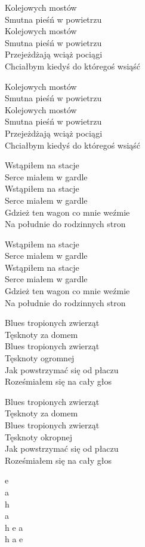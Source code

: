 
\begin{text}
    Kolejowych mostów\\
    Smutna pieśń w powietrzu\\
    Kolejowych mostów\\
    Smutna pieśń w powietrzu\\
    Przejeżdżają wciąż pociągi\\
    Chciałbym kiedyś do któregoś wsiąść

    Kolejowych mostów\\
    Smutna pieśń w powietrzu\\
    Kolejowych mostów\\
    Smutna pieśń w powietrzu\\
    Przejeżdżają wciąż pociągi\\
    Chciałbym kiedyś do któregoś wsiąść

    Wstąpiłem na stacje\\
    Serce miałem w gardle\\
    Wstąpiłem na stacje\\
    Serce miałem w gardle\\
    Gdzież ten wagon co mnie weźmie\\
    Na południe do rodzinnych stron

    Wstąpiłem na stacje\\
    Serce miałem w gardle\\
    Wstąpiłem na stacje\\
    Serce miałem w gardle\\
    Gdzież ten wagon co mnie weźmie\\
    Na południe do rodzinnych stron

    Blues tropionych zwierząt\\
    Tęsknoty za domem\\
    Blues tropionych zwierząt\\
    Tęsknoty ogromnej\\
    Jak powstrzymać się od płaczu\\
    Roześmiałem się na cały głos

    Blues tropionych zwierząt\\
    Tęsknoty za domem\\
    Blues tropionych zwierząt\\
    Tęsknoty okropnej\\
    Jak powstrzymać się od płaczu\\
    Roześmiałem się na cały głos
\end{text}
\begin{chord}
    e\\
    a\\
    h\\
    a\\
    h e a\\
    h a e
\end{chord}